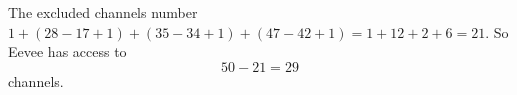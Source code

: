 The excluded channels number $1+(28-17+1)+(35-34+1)+(47-42+1)=1+12+2+6=21$. So Eevee has access to
\[50-21=\boxed{29}\]
channels.

